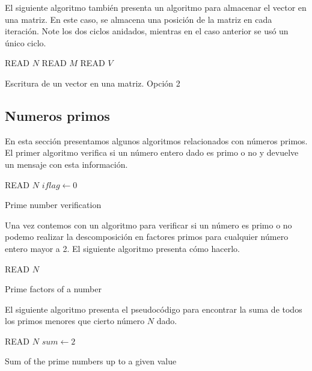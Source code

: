 El siguiente algoritmo también presenta un algoritmo para almacenar el vector en una matriz. En este caso, se almacena una posición de la matriz en cada iteración. Note los dos ciclos anidados, mientras en el caso anterior se usó un único ciclo.\\
\begin{algorithm}[H]
\SetAlgoLined
{}
READ $N$\;
READ $M$\;
READ $V$\;
\caption{Escritura de un vector en una matriz. Opción 2}
\label{matrix}
\end{algorithm}


\subsection{Numeros primos}
En esta sección presentamos algunos algoritmos relacionados con números primos. El primer algoritmo verifica si un número entero dado es primo o no y devuelve un mensaje con esta información.\\
\begin{algorithm}[H]
\SetAlgoLined
READ $N$\;
$iflag \leftarrow 0$ \;
\caption{Prime number verification}
\label{algo:primos}
\end{algorithm}

Una vez contemos con un algoritmo para verificar si un número es primo o no
podemo realizar la descomposición en factores primos para cualquier número
entero mayor a 2. El siguiente algoritmo presenta cómo hacerlo.\\
\begin{algorithm}[H]
\SetAlgoLined
READ $N$\;
\caption{Prime factors of a number}
\label{algo:primos_factores}
\end{algorithm}

El siguiente algoritmo presenta el pseudocódigo para encontrar la suma de todos
los primos menores que cierto número $N$ dado.\\
\begin{algorithm}[H]
\SetAlgoLined
{}
READ $N$\;
$sum \leftarrow 2$ \;
\caption{Sum of the prime numbers up to a given value}
\label{algo:primos_suma}
\end{algorithm}

